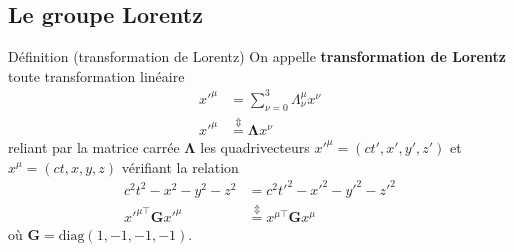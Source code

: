     \subsection{Le groupe Lorentz}

    \begin{omed}{Définition (transformation de Lorentz)}
        On appelle \textbf{transformation de Lorentz} toute transformation linéaire 
        \begin{align*}
            x'^{\mu} &= \sum_{\nu = 0}^3 \Lambda_{\nu}^{\mu} x^{\nu} \\
            x'^{\mu} &\overset{\Updownarrow}{=} \symbf{\Lambda} x^{\nu} 
        \end{align*}
        reliant par la matrice carrée $\symbf{\Lambda}$ les quadrivecteurs $x'^{\mu} = (ct', x', y', z')$ et $x^{\mu} = (ct,x,y,z)$ vérifiant la relation 
        \begin{align*}
            c^2 t^2 - x^2 - y^2 - z^2 &= c^2 t'^2 - x'^2 - y'^2 - z'^2 \\
            x'^{\mu\top} \mathbf{G} x'^{\mu} &\overset{\Updownarrow}{=} x^{\mu\top} \mathbf{G} x^{\mu} 
        \end{align*}
        où $\mathbf{G} = \text{diag}(1, -1, -1, -1)$.
    \end{omed}

